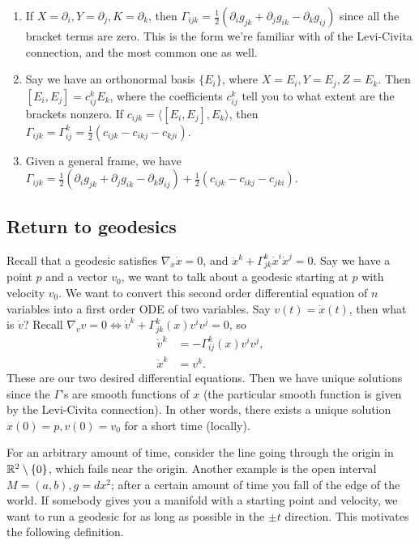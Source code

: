 \begin{enumerate}[label=(\arabic*)]
    \item If $X=\partial _i ,Y=\partial _j ,K=\partial _k$, then $\Gamma _{ijk}=\frac{1}{2}\left( \partial _i g_{jk}+\partial _j g_{ik}-\partial _kg_{ij} \right)$ since all the bracket terms are zero. This is the form we're familiar with of the Levi-Civita connection, and the most common one as well.
    \item Say we have an orthonormal basis $\{E_i \} $, where $X=E_i ,Y=E_j ,Z=E_k$. Then $[E_i ,E_j ]=c_{ij}^k E_k$, where the coefficients $c_{ij}^k$ tell you to what extent are the brackets nonzero. If $c_{ijk}=\langle [E_i ,E_j ] ,E_k\rangle $, then $\Gamma _{ijk}=\Gamma _{ij}^k=\frac{1}{2}(c_{ijk}-c_{ikj}-c_{kji})$.
    \item Given a general frame, we have $\Gamma _{ijk}=\frac{1}{2}(\partial _i g_{jk}+\partial _j g_{ik}-\partial _kg_{ij})+\frac{1}{2}(c_{ijk}-c_{ikj}-c_{jki})$.
\end{enumerate}

\subsection{Return to geodesics}
Recall that a geodesic satisfies $\nabla_{\dot x}\dot x=0$, and $\ddot x^k +\Gamma _{jk}^k \dot x^i \dot x^j =0$. Say we have a point $p$ and a vector $v_0$, we want to talk about a geodesic starting at $p$ with velocity $v_0$. We want to convert this second order differential equation of $n$ variables into a first order ODE of two variables. Say $v(t)=\dot x(t)$, then what is $\dot v$? Recall $\nabla_v v=0 \iff \dot v^k+\Gamma _{jk}^k(x)v^i v^j=0$, so  
    \begin{align*}
        \dot v^k&= -\Gamma _{ij}^k(x)v^i v^j ,\\
        \dot x^k&=v^k.
    \end{align*}These are our two desired differential equations. Then we have unique solutions since the $\Gamma $'s are smooth functions of $x$ (the particular smooth function is given by the Levi-Civita connection). In other words, there exists a unique solution $x(0)=p,v(0)=v_0$ for a short time (locally). 

    For an arbitrary amount of time, consider the line going through the origin in $\mathbb{R}^2\setminus \{0\} $, which fails near the origin. Another example is the open interval $M=(a,b), g=dx ^2$; after a certain amount of time you fall of the edge of the world. If somebody gives you a manifold with a starting point and velocity, we want to run a geodesic for as long as possible in the $\pm t$ direction. This motivates the following definition.

